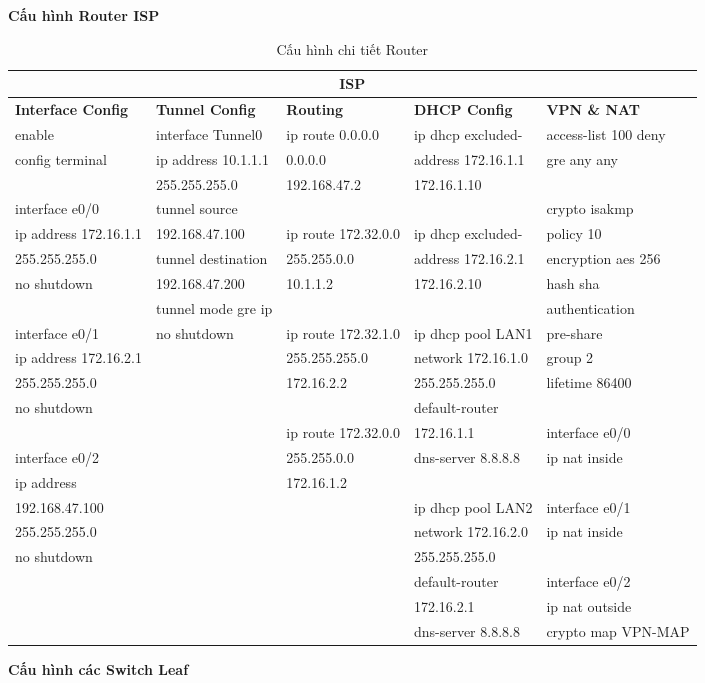 \newpage
\textbf{Cấu hình Router ISP}
\begin{table}[H]
\centering
\begin{tabular}{|p{3cm}|p{3cm}|p{3cm}|p{3cm}|p{3cm}|}
\hline
\multicolumn{5}{|c|}{ISP} \\
\hline
\textbf{Interface Config} & \textbf{Tunnel Config} & \textbf{Routing} & \textbf{DHCP Config} & \textbf{VPN \& NAT} \\
\hline
enable & interface Tunnel0 & ip route 0.0.0.0 & ip dhcp excluded- & access-list 100 deny \\
config terminal & ip address 10.1.1.1 & 0.0.0.0 & address 172.16.1.1 & gre any any \\
 & 255.255.255.0 & 192.168.47.2 & 172.16.1.10 & \\
interface e0/0 & tunnel source & & & crypto isakmp \\
ip address 172.16.1.1 & 192.168.47.100 & ip route 172.32.0.0 & ip dhcp excluded- & policy 10 \\
255.255.255.0 & tunnel destination & 255.255.0.0 & address 172.16.2.1 & encryption aes 256 \\
no shutdown & 192.168.47.200 & 10.1.1.2 & 172.16.2.10 & hash sha \\
 & tunnel mode gre ip & & & authentication \\
interface e0/1 & no shutdown & ip route 172.32.1.0 & ip dhcp pool LAN1 & pre-share \\
ip address 172.16.2.1 & & 255.255.255.0 & network 172.16.1.0 & group 2 \\
255.255.255.0 & & 172.16.2.2 & 255.255.255.0 & lifetime 86400 \\
no shutdown & & & default-router & \\
 & & ip route 172.32.0.0 & 172.16.1.1 & interface e0/0 \\
interface e0/2 & & 255.255.0.0 & dns-server 8.8.8.8 & ip nat inside \\
ip address & & 172.16.1.2 & & \\
192.168.47.100 & & & ip dhcp pool LAN2 & interface e0/1 \\
255.255.255.0 & & & network 172.16.2.0 & ip nat inside \\
no shutdown & & & 255.255.255.0 & \\
 & & & default-router & interface e0/2 \\
 & & & 172.16.2.1 & ip nat outside \\
 & & & dns-server 8.8.8.8 & crypto map VPN-MAP \\
\hline
\end{tabular}
\caption{Cấu hình chi tiết Router}
\end{table}
\newpage
\textbf{Cấu hình các Switch Leaf}

